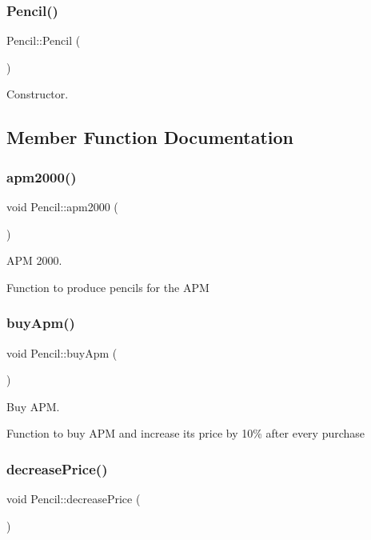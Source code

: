 \subsubsection{\texorpdfstring{Pencil()}{Pencil()}}
{\footnotesize\ttfamily Pencil\+::\+Pencil (\begin{DoxyParamCaption}{ }\end{DoxyParamCaption})}

Constructor. 

\subsection{Member Function Documentation}
\mbox{\label{classPencil_ad1f8942401865e05d2a220f64a309f3e}} 
\subsubsection{\texorpdfstring{apm2000()}{apm2000()}}
{\footnotesize\ttfamily void Pencil\+::apm2000 (\begin{DoxyParamCaption}{ }\end{DoxyParamCaption})}

A\+PM 2000.

Function to produce pencils for the A\+PM \mbox{\label{classPencil_a506c7c9587a026f1238e880b1b103c2f}} 
\subsubsection{\texorpdfstring{buy\+Apm()}{buyApm()}}
{\footnotesize\ttfamily void Pencil\+::buy\+Apm (\begin{DoxyParamCaption}{ }\end{DoxyParamCaption})}

Buy A\+PM.

Function to buy A\+PM and increase its price by 10\% after every purchase \mbox{\label{classPencil_a84aeeb98b1caa424d92c312e56e42797}} 
\subsubsection{\texorpdfstring{decrease\+Price()}{decreasePrice()}}
{\footnotesize\ttfamily void Pencil\+::decrease\+Price (\begin{DoxyParamCaption}{ }\end{DoxyParamCaption})}

